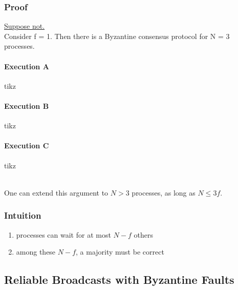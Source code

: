 \documentclass{article}
\begin{document}
\begin{adjustwidth}{2em}{2em}
\begin{adjustwidth}{2em}{2em}
			\subsubsection{Proof}
			\begin{adjustwidth}{2em}{}
				\underline{Suppose not.} \\
				Consider f = 1. Then there is a Byzantine consensus protocol for N = 3 processes.
				\paragraph{Execution A}
				\begin{center}
					tikz
				\end{center}
				\paragraph{Execution B}
				\begin{center}
					tikz
				\end{center}
				\paragraph{Execution C}
				\begin{center}
					tikz
				\end{center}
				\hfill \\
				One can extend this argument to $N > 3$ processes, as long as $N \leq 3f$.
			\end{adjustwidth}
			\subsubsection{Intuition}
			\begin{adjustwidth}{2em}{}
				\begin{enumerate}[-]
					\item processes can wait for at most $N-f$ others
					\item among these $N-f$, a majority must be correct
				\end{enumerate}
			\end{adjustwidth}
		\end{adjustwidth}
		\subsection{Reliable Broadcasts with Byzantine Faults}
		\begin{adjustwidth}{2em}{2em}

\end{adjustwidth}
\end{adjustwidth}
\end{document}
